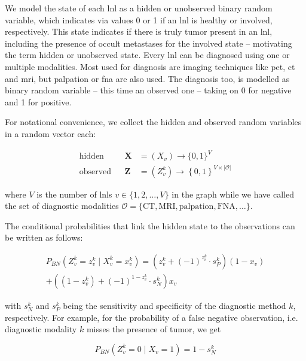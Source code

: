\documentclass[../ms.tex]{subfiles}
\begin{document}
We model the state of each \gls{lnl} as a hidden or unobserved binary random variable, which indicates via values 0 or 1 if an \gls{lnl} is healthy or involved, respectively. This state indicates if there is truly tumor present in an \gls{lnl}, including the presence of occult metastases for the involved state – motivating the term hidden or unobserved state. Every \gls{lnl} can be diagnosed using one or multiple modalities. Most used for diagnosis are imaging techniques like \gls{pet}, \gls{ct} and \gls{mri}, but palpation or \gls{fna} are also used. The diagnosis too, is modelled as binary random variable – this time an observed one – taking on 0 for negative and 1 for positive.

For notational convenience, we collect the hidden and observed random variables in a random vector each:

\begin{equation}
    \begin{aligned}
        \text{hidden}& & \mathbf{X} &= ( X_v ) \rightarrow \{ 0,1 \}^V \\
        \text{observed}& & \mathbf{Z} &= ( Z_v^k ) \rightarrow \left\{ 0, 1 \right\}^{V \times |\mathcal{O}|}
    \end{aligned}
\end{equation}

where $V$ is the number of \glspl{lnl} $v \in \{ 1,2,\ldots,V \}$ in the graph while we have called the set of diagnostic modalities $\mathcal{O} = \{ \text{CT}, \text{MRI}, \text{palpation}, \text{FNA}, \ldots \}$.

The conditional probabilities that link the hidden state to the observations can be written as follows:

\begin{multline}
    P_{BN} \left( Z_v^k = z_v^k \mid X_v^k = x_v^k \right) = \left( z_v^k + (-1)^{z_v^k} \cdot s_P^k \right)(1 - x_v) \\ 
    + \left( (1 - z_v^k) + (-1)^{1 - z_v^k} \cdot s_N^k \right) x_v
\end{multline}

with $s_N^k$ and $s_P^k$ being the sensitivity and specificity of the diagnostic method $k$, respectively. For example, for the probability of a false negative observation, i.e. diagnostic modality $k$ misses the presence of tumor, we get

\begin{equation}
    P_{BN} \left( Z_v^k = 0 \mid X_v = 1 \right) = 1 - s_N^k
\end{equation}
\end{document}

